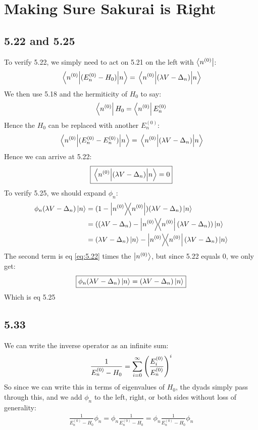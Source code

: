 \documentclass[12pt]{article}
\begin{document}
\section{Making Sure Sakurai is Right}
\subsection{5.22 and 5.25}
To verify 5.22, we simply need to act on 5.21 on the left with $\bra{n^{(0)}}$:
\begin{align*}
  \mel{n^{(0)}}{(E_n^{(0)}-H_0)}{n}=\mel{n^{(0)}}{(\lambda V-\Delta_n)}{n}
\end{align*}
We then use 5.18 and the hermiticity of $H_0$ to say:
\begin{align*}
  \bra{n^{(0)}}H_0=\bra{n^{(0)}}E_n^{(0)}
\end{align*}
Hence the $H_0$ can be replaced with another $E_n^{(0)}$:
\begin{align*}
  \mel{n^{(0)}}{(E_n^{(0)}-E_n^{(0)})}{n}=\mel{n^{(0)}}{(\lambda V-\Delta_n)}{n}
\end{align*}
Hence we can arrive at 5.22:
\begin{align}
  \label{eq:5.22}
  \boxed{\mel{n^{(0)}}{(\lambda V-\Delta_n)}{n}=0}
\end{align}
To verify 5.25, we should expand $\phi_n$:
\begin{align*}
  \phi_n(\lambda V-\Delta_n)\ket{n}&=
  (1-\dyad{n^{(0)}})(\lambda V-\Delta_n)\ket{n}\\
  &=((\lambda V-\Delta_n)-\dyad{n^{(0)}}(\lambda V-\Delta_n))\ket{n}\\
  &=(\lambda V-\Delta_n)\ket{n}-\dyad{n^{(0)}}(\lambda V-\Delta_n)\ket{n}
\end{align*}
The second term is eq \eqref{eq:5.22} times the $\ket{n^{(0)}}$, but since 5.22 equals 0, we only get:
\begin{align}
  \label{eq:5.25}
  \boxed{\phi_n(\lambda V-\Delta_n)\ket{n}=(\lambda V-\Delta_n)\ket{n}}
\end{align}
Which is eq 5.25

\subsection{5.33}
We can write the inverse operator as an infinite sum:
\begin{align*}
  \frac{1}{E_n^{(0)}-H_0}=\sum_{i=0}^\infty\qty(\frac{E_i^{(0)}}{E^{(0)}_n})^i
\end{align*}
So since we can write this in terms of eigenvalues of $H_0$, the dyads simply pass through this, and we add $\phi_n$ to the left, right, or both sides without loss of generality:
\begin{align}
  \boxed{\frac{1}{E_n^{(0)}-H_0}\phi_n=\phi_n\frac{1}{E_n^{(0)}-H_0}=
    \phi_n\frac{1}{E_n^{(0)}-H_0}\phi_n}
\end{align}
\end{document}
